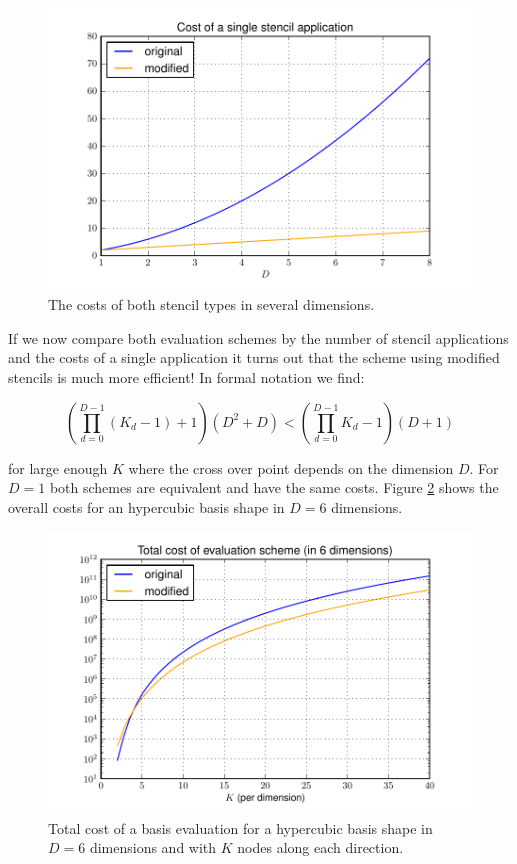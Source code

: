 \begin{figure}
  \centering
  \includegraphics[scale=0.5]{./fig/cost_stencil_application.pdf}
  \caption{The costs of both stencil types in several dimensions.}
  \label{fig:cost_stencil_application}
\end{figure}

If we now compare both evaluation schemes by the number of stencil applications
and the costs of a single application it turns out that the scheme using modified
stencils is much more efficient! In formal notation we find:

\begin{equation*}
  \left(\prod_{d=0}^{D-1} (K_d -1) +1\right) (D^2+D) < \left(\prod_{d=0}^{D-1} K_d -1\right) (D+1)
\end{equation*}

for large enough $K$ where the cross over point depends on the dimension $D$.
For $D = 1$ both schemes are equivalent and have the same costs. Figure
\ref{fig:total_cost_evaluation} shows the overall costs for an hypercubic
basis shape in $D=6$ dimensions.

\begin{figure}
  \centering
  \includegraphics[scale=0.5]{./fig/total_cost_evaluation.pdf}
  \caption{Total cost of a basis evaluation for a hypercubic basis shape
           in $D=6$ dimensions and with $K$ nodes along each direction.}
  \label{fig:total_cost_evaluation}
\end{figure}


